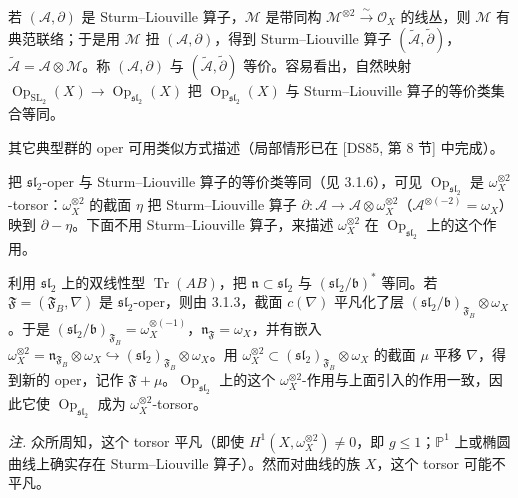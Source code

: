 若 $(\mathcal{A},\partial)$ 是 Sturm--Liouville 算子，$\mathcal{M}$ 是带同构 $\mathcal{M}^{\otimes 2} \xrightarrow{\sim} \mathcal{O}_X$ 的线丛，则 $\mathcal{M}$ 有典范联络；于是用 $\mathcal{M}$ 扭 $(\mathcal{A},\partial)$，得到 Sturm--Liouville 算子 $(\tilde{\mathcal{A}},\tilde{\partial})$，$\tilde{\mathcal{A}} = \mathcal{A}\otimes\mathcal{M}$。称 $(\mathcal{A},\partial)$ 与 $(\tilde{\mathcal{A}},\tilde{\partial})$ 等价。容易看出，自然映射 $\operatorname{Op}_{\mathrm{SL}_2}(X) \to \operatorname{Op}_{\mathfrak{sl}_2}(X)$ 把 $\operatorname{Op}_{\mathfrak{sl}_2}(X)$ 与 Sturm--Liouville 算子的等价类集合等同。

其它典型群的 oper 可用类似方式描述（局部情形已在 [DS85, 第 8 节] 中完成）。


 把 $\mathfrak{sl}_2$-oper 与 Sturm--Liouville 算子的等价类等同（见 3.1.6），可见 $\operatorname{Op}_{\mathfrak{sl}_2}$ 是 $\omega_X^{\otimes 2}$-torsor：$\omega_X^{\otimes 2}$ 的截面 $\eta$ 把 Sturm--Liouville 算子 $\partial: \mathcal{A} \to \mathcal{A}\otimes\omega_X^{\otimes 2}$（$\mathcal{A}^{\otimes(-2)} = \omega_X$）映到 $\partial - \eta$。下面不用 Sturm--Liouville 算子，来描述 $\omega_X^{\otimes 2}$ 在 $\operatorname{Op}_{\mathfrak{sl}_2}$ 上的这个作用。

利用 $\mathfrak{sl}_2$ 上的双线性型 $\operatorname{Tr}(AB)$，把 $\mathfrak{n} \subset \mathfrak{sl}_2$ 与 $(\mathfrak{sl}_2/\mathfrak{b})^*$ 等同。若 $\mathfrak{F} = (\mathfrak{F}_B,\nabla)$ 是 $\mathfrak{sl}_2$-oper，则由 3.1.3，截面 $c(\nabla)$ 平凡化了层 $(\mathfrak{sl}_2/\mathfrak{b})_{\mathfrak{F}_B}\otimes\omega_X$。于是 $(\mathfrak{sl}_2/\mathfrak{b})_{\mathfrak{F}_B} = \omega_X^{\otimes(-1)}$，$\mathfrak{n}_{\mathfrak{F}} = \omega_X$，并有嵌入 $\omega_X^{\otimes 2} = \mathfrak{n}_{\mathfrak{F}_B}\otimes\omega_X \hookrightarrow (\mathfrak{sl}_2)_{\mathfrak{F}_B}\otimes\omega_X$。用 $\omega_X^{\otimes 2} \subset (\mathfrak{sl}_2)_{\mathfrak{F}_B}\otimes\omega_X$ 的截面 $\mu$ 平移 $\nabla$，得到新的 oper，记作 $\mathfrak{F}+\mu$。$\operatorname{Op}_{\mathfrak{sl}_2}$ 上的这个 $\omega_X^{\otimes 2}$-作用与上面引入的作用一致，因此它使 $\operatorname{Op}_{\mathfrak{sl}_2}$ 成为 $\omega_X^{\otimes 2}$-torsor。

\emph{注.} 众所周知，这个 torsor 平凡（即使 $H^1(X,\omega_X^{\otimes 2}) \ne 0$，即 $g \le 1$；$\mathbb{P}^1$ 上或椭圆曲线上确实存在 Sturm--Liouville 算子）。然而对曲线的族 $X$，这个 torsor 可能不平凡。

